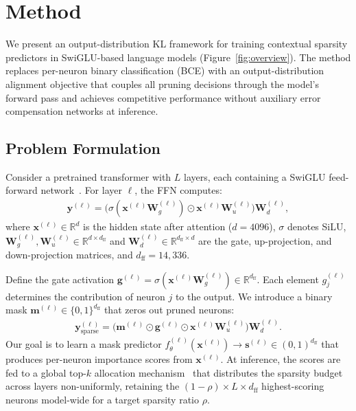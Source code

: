 \section{Method}
\label{sec:method}

We present an output-distribution KL framework for training contextual sparsity predictors in SwiGLU-based language models (Figure~\ref{fig:overview}).
The method replaces per-neuron binary classification (BCE) with an output-distribution alignment objective that couples all pruning decisions through the model's forward pass and achieves competitive performance without auxiliary error compensation networks at inference.

\subsection{Problem Formulation}
\label{sec:method:formulation}

Consider a pretrained transformer with $L$ layers, each containing a SwiGLU feed-forward network~\cite{shazeer2020glu}.
For layer $\ell$, the FFN computes:
\begin{align}
\mathbf{y}^{(\ell)} = \bigl(\sigma(\mathbf{x}^{(\ell)} \mathbf{W}_g^{(\ell)}) \odot \mathbf{x}^{(\ell)} \mathbf{W}_u^{(\ell)}\bigr) \mathbf{W}_d^{(\ell)},
\label{eq:swiglu}
\end{align}
where $\mathbf{x}^{(\ell)} \in \mathbb{R}^{d}$ is the hidden state after attention ($d{=}4096$), $\sigma$ denotes SiLU, $\mathbf{W}_g^{(\ell)}, \mathbf{W}_u^{(\ell)} \in \mathbb{R}^{d \times d_{\text{ff}}}$ and $\mathbf{W}_d^{(\ell)} \in \mathbb{R}^{d_{\text{ff}} \times d}$ are the gate, up-projection, and down-projection matrices, and $d_{\text{ff}}{=}14{,}336$.

Define the gate activation $\mathbf{g}^{(\ell)} = \sigma(\mathbf{x}^{(\ell)} \mathbf{W}_g^{(\ell)}) \in \mathbb{R}^{d_{\text{ff}}}$.
Each element $g_j^{(\ell)}$ determines the contribution of neuron $j$ to the output.
We introduce a binary mask $\mathbf{m}^{(\ell)} \in \{0,1\}^{d_{\text{ff}}}$ that zeros out pruned neurons:
\begin{align}
\mathbf{y}_{\text{sparse}}^{(\ell)} = \bigl(\mathbf{m}^{(\ell)} \odot \mathbf{g}^{(\ell)} \odot \mathbf{x}^{(\ell)} \mathbf{W}_u^{(\ell)}\bigr) \mathbf{W}_d^{(\ell)}.
\label{eq:sparse_ffn}
\end{align}
Our goal is to learn a mask predictor $f_\theta^{(\ell)}(\mathbf{x}^{(\ell)}) \to \mathbf{s}^{(\ell)} \in (0,1)^{d_{\text{ff}}}$ that produces per-neuron importance scores from $\mathbf{x}^{(\ell)}$.
At inference, the scores are fed to a global top-$k$ allocation mechanism~\cite{liu2025teal} that distributes the sparsity budget across layers non-uniformly, retaining the $(1{-}\rho) \times L \times d_{\text{ff}}$ highest-scoring neurons model-wide for a target sparsity ratio $\rho$.


